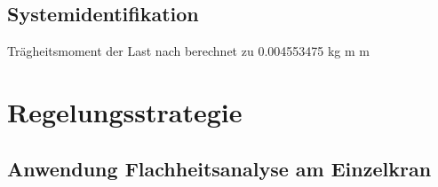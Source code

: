 \section{Systemidentifikation}
Trägheitsmoment der Last nach %
berechnet zu 0.004553475 kg m m

\chapter{Regelungsstrategie}
\section{Anwendung Flachheitsanalyse am Einzelkran}


